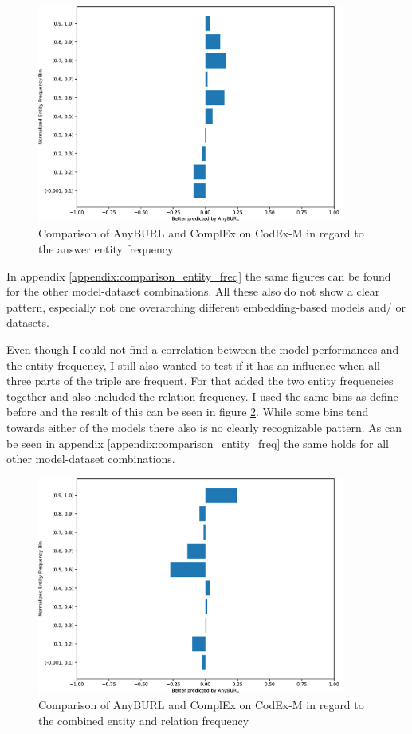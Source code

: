 \begin{figure}[H]
\centering
\includegraphics[width=0.9\textwidth]{images/entity_freq_answer_anyburl_complex_codex.PNG}
\caption{Comparison of AnyBURL and ComplEx on CodEx-M in regard to the answer entity frequency}
\label{fig:entity_answer_tail_anyburl_complex_codex}
\end{figure}

In appendix \ref{appendix:comparison_entity_freq} the same figures can be found for the other model-dataset combinations. All these also do not show a clear pattern, especially not one overarching different embedding-based models and/ or datasets. 

Even though I could not find a correlation between the model performances and the entity frequency, I still also wanted to test if it has an influence when all three parts of the triple are frequent. For that added the two entity frequencies together and also included the relation frequency. I used the same bins as define before and the result of this can be seen in figure \ref{fig:combined_freq_anyburl_complex_codex}. While some bins tend towards either of the models there also is no clearly recognizable pattern. As can be seen in appendix \ref{appendix:comparison_entity_freq} the same holds for all other model-dataset combinations.

\begin{figure}[H]
\centering
\includegraphics[width=0.9\textwidth]{images/combined_freq_anyburl_complex_codex.PNG}
\caption{Comparison of AnyBURL and ComplEx on CodEx-M in regard to the combined entity and relation frequency}
\label{fig:combined_freq_anyburl_complex_codex}
\end{figure}


